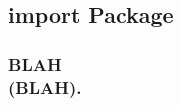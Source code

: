 \documentclass[class=book , crop=false]{standalone}
\title{}  %
\begin{document}


\subsection{import Package}
\medskip
\subsubsection{\Large BLAH \\\small(BLAH).}
\end{document}
